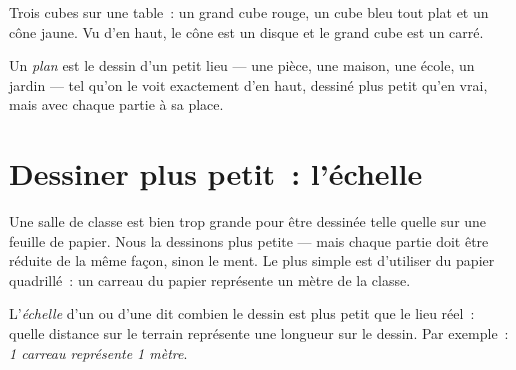 \begin{omfigure}

{\small Trois cubes sur une table~: un grand cube rouge, un cube bleu tout
plat et un cône jaune. Vu d'en haut, le cône est un disque et le grand
cube est un carré.}
\label{fig:g2:drawing-to-map:blocks}
\end{omfigure}

\begin{definition}[Plan]\label{def:g2:drawing-to-map:plan}
Un \emph{plan} est le dessin d'un petit lieu --- une pièce,
une maison, une école, un jardin --- tel qu'on le voit exactement d'en
haut, dessiné plus petit qu'en vrai, mais avec chaque partie à sa place.
\end{definition}

\section{Dessiner plus petit~: l'échelle}

Une salle de classe est bien trop grande pour être dessinée telle quelle
sur une feuille de papier. Nous la dessinons plus petite --- mais chaque
partie doit être réduite de la même façon, sinon le  ment. Le plus
simple est d'utiliser du papier quadrillé~: un carreau du papier
représente un mètre de la classe.

\begin{definition}[Échelle]\label{def:g2:drawing-to-map:scale}
L'\emph{échelle} d'un  ou d'une  dit
combien le dessin est plus petit que le lieu réel~: quelle distance sur le
terrain représente une longueur sur le dessin. Par exemple~:
\emph{1 carreau représente 1 mètre}.
\end{definition}

